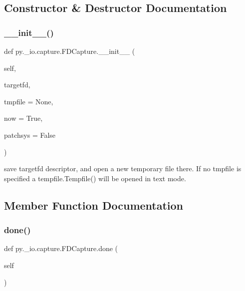 \subsection{Constructor \& Destructor Documentation}
\mbox{\label{classpy_1_1__io_1_1capture_1_1_f_d_capture_aa65e767565e80eaa2770917cc5d2ceec}} 
\subsubsection{\texorpdfstring{\+\_\+\+\_\+init\+\_\+\+\_\+()}{\_\_init\_\_()}}
{\footnotesize\ttfamily def py.\+\_\+io.\+capture.\+F\+D\+Capture.\+\_\+\+\_\+init\+\_\+\+\_\+ (\begin{DoxyParamCaption}\item[{}]{self,  }\item[{}]{targetfd,  }\item[{}]{tmpfile = {\ttfamily None},  }\item[{}]{now = {\ttfamily True},  }\item[{}]{patchsys = {\ttfamily False} }\end{DoxyParamCaption})}

\begin{DoxyVerb}save targetfd descriptor, and open a new
    temporary file there.  If no tmpfile is
    specified a tempfile.Tempfile() will be opened
    in text mode.
\end{DoxyVerb}
 

\subsection{Member Function Documentation}
\mbox{\label{classpy_1_1__io_1_1capture_1_1_f_d_capture_a6816f0c6c3af5924565a252050255b59}} 
\subsubsection{\texorpdfstring{done()}{done()}}
{\footnotesize\ttfamily def py.\+\_\+io.\+capture.\+F\+D\+Capture.\+done (\begin{DoxyParamCaption}\item[{}]{self }\end{DoxyParamCaption})}

